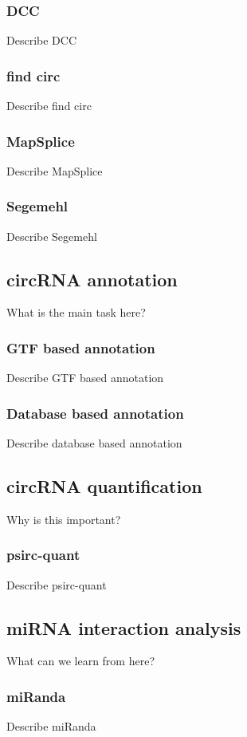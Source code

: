 \subsubsection{DCC}
Describe DCC

\subsubsection{find circ}
Describe find circ

\subsubsection{MapSplice}
Describe MapSplice

\subsubsection{Segemehl}
Describe Segemehl

\subsection{circRNA annotation}
What is the main task here?

\subsubsection{GTF based annotation}
Describe GTF based annotation

\subsubsection{Database based annotation}
Describe database based annotation

\subsection{circRNA quantification}

Why is this important?

\subsubsection{psirc-quant}
Describe psirc-quant

\subsection{miRNA interaction analysis}
What can we learn from here?

\subsubsection{miRanda}
Describe miRanda

